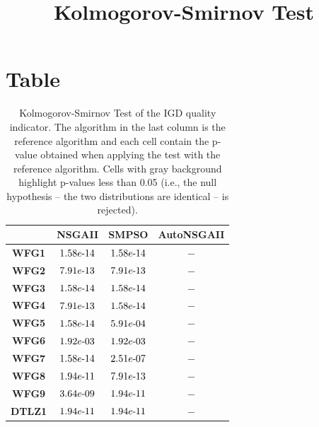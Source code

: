 \documentclass{article}
\title{Kolmogorov-Smirnov Test}
\author{}
\begin{document}
\maketitle
\section{Table}
\begin{table}[!htp]
  \caption{Kolmogorov-Smirnov Test of the IGD quality indicator. The algorithm in the last column is the reference algorithm and each cell contain the p-value obtained when applying the test with the reference algorithm. Cells with gray background highlight p-values less than 0.05 (i.e., the null hypothesis -- the two distributions are identical -- is rejected).}
  \label{table:IGD}
  \centering
  \begin{tiny}
  \begin{tabular}{c|ccc}
      & \textbf{NSGAII} & \textbf{SMPSO} & \textbf{AutoNSGAII} \\\hline
\textbf{WFG1} & $\cellcolor{gray25} 1.58e\makebox[0.1cm]{-}14 $ & $ \cellcolor{gray25} 1.58e\makebox[0.1cm]{-}14 $ & $ -$ \\
\textbf{WFG2} & $\cellcolor{gray25} 7.91e\makebox[0.1cm]{-}13 $ & $ \cellcolor{gray25} 7.91e\makebox[0.1cm]{-}13 $ & $ -$ \\
\textbf{WFG3} & $\cellcolor{gray25} 1.58e\makebox[0.1cm]{-}14 $ & $ \cellcolor{gray25} 1.58e\makebox[0.1cm]{-}14 $ & $ -$ \\
\textbf{WFG4} & $\cellcolor{gray25} 7.91e\makebox[0.1cm]{-}13 $ & $ \cellcolor{gray25} 1.58e\makebox[0.1cm]{-}14 $ & $ -$ \\
\textbf{WFG5} & $\cellcolor{gray25} 1.58e\makebox[0.1cm]{-}14 $ & $ \cellcolor{gray25} 5.91e\makebox[0.1cm]{-}04 $ & $ -$ \\
\textbf{WFG6} & $\cellcolor{gray25} 1.92e\makebox[0.1cm]{-}03 $ & $ \cellcolor{gray25} 1.92e\makebox[0.1cm]{-}03 $ & $ -$ \\
\textbf{WFG7} & $\cellcolor{gray25} 1.58e\makebox[0.1cm]{-}14 $ & $ \cellcolor{gray25} 2.51e\makebox[0.1cm]{-}07 $ & $ -$ \\
\textbf{WFG8} & $\cellcolor{gray25} 1.94e\makebox[0.1cm]{-}11 $ & $ \cellcolor{gray25} 7.91e\makebox[0.1cm]{-}13 $ & $ -$ \\
\textbf{WFG9} & $\cellcolor{gray25} 3.64e\makebox[0.1cm]{-}09 $ & $ \cellcolor{gray25} 1.94e\makebox[0.1cm]{-}11 $ & $ -$ \\
\textbf{DTLZ1} & $\cellcolor{gray25} 1.94e\makebox[0.1cm]{-}11 $ & $ \cellcolor{gray25} 1.94e\makebox[0.1cm]{-}11 $ & $ -$ \\

\end{tabular}
\end{tiny}
\end{table}
\end{document}
